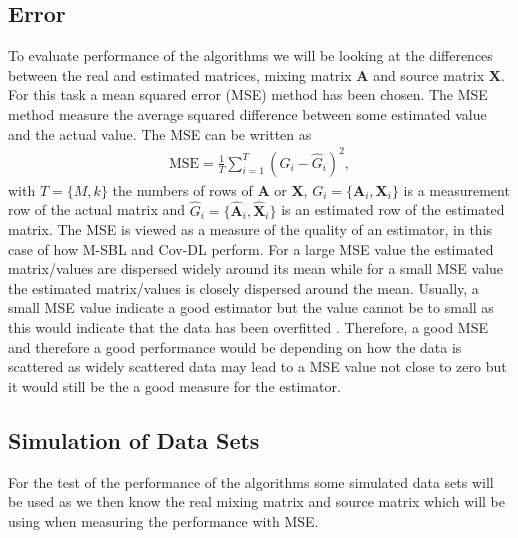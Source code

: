 \subsection{Error}
To evaluate performance of the algorithms we will be looking at the differences between the real and estimated matrices, mixing matrix $\mathbf{A}$ and source matrix $\mathbf{X}$.
For this task a mean squared error (MSE) method has been chosen. 
The MSE method measure the average squared difference between some estimated value and the actual value. 
The MSE can be written as
\begin{align*}
\text{MSE} = \frac{1}{T} \sum_{i=1}^T (G_i - \hat{G}_i)^2,  
\end{align*}
with $T = \{M, k\}$ the numbers of rows of $\mathbf{A}$ or $\mathbf{X}$, $G_i = \{ \mathbf{A}_i, \mathbf{X}_i\}$ is a measurement row of the actual matrix and $\hat{G}_i = \{\hat{\mathbf{A}}_i,\hat{\mathbf{X}}_i\}$ is an estimated row of the estimated matrix.
The MSE is viewed as a measure of the quality of an estimator, in this case of how M-SBL and Cov-DL perform. 
For a large MSE value the estimated matrix/values are dispersed widely around its mean while for a small MSE value the estimated matrix/values is closely dispersed around the mean. 
Usually, a small MSE value indicate a good estimator but the value cannot be to small as this would indicate that the data has been overfitted . 
Therefore, a good MSE and therefore a good performance would be depending on how the data is scattered as widely scattered data may lead to a MSE value not close to zero but it would still be the a good measure for the estimator.

\subsection{Simulation of Data Sets}\label{sec:dataset}
For the test of the performance of the algorithms some simulated data sets will be used as we then know the real mixing matrix and source matrix which will be using when measuring the performance with MSE.

